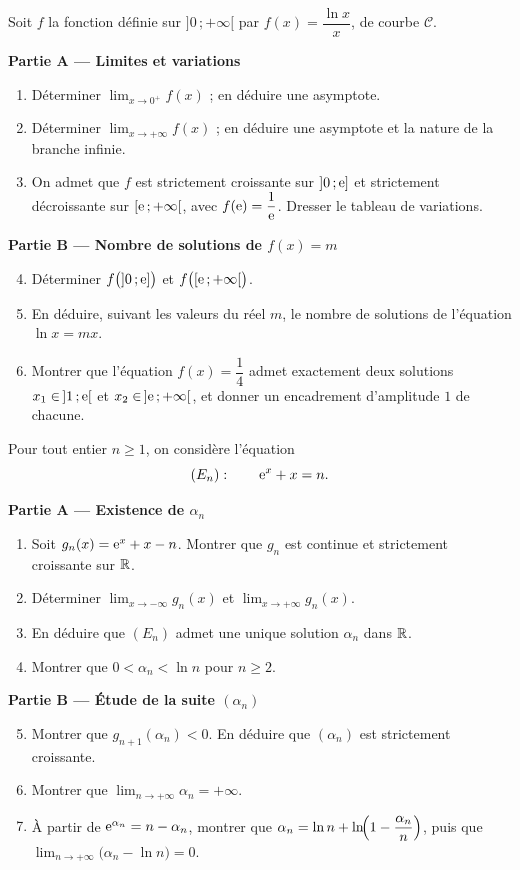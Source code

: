 Soit $f$ la fonction définie sur $]0\,;+\infty[$ par $f(x)=\dfrac{\ln x}{x}$,
de courbe $\mathcal C$.

\textbf{Partie A — Limites et variations}
\begin{enumerate}
	\item Déterminer $\displaystyle\lim_{x\to 0^+}f(x)$ ; en déduire une
	asymptote.
	\item Déterminer $\displaystyle\lim_{x\to+\infty}f(x)$ ; en déduire une
	asymptote et la nature de la branche infinie.
	\item On admet que $f$ est strictement croissante sur $]0\,;\mathrm{e}]$ et
	strictement décroissante sur $[\mathrm{e}\,;+\infty[$, avec $f(\mathrm{e})=\dfrac{1}{\mathrm{e}}$.
	Dresser le tableau de variations.
\end{enumerate}

\textbf{Partie B — Nombre de solutions de $f(x)=m$}
\begin{enumerate}
	\setcounter{enumi}{3}
	\item Déterminer $f\bigl(]0\,;\mathrm{e}]\bigr)$ et $f\bigl([\mathrm{e}\,;+\infty[\bigr)$.
	\item En déduire, suivant les valeurs du réel $m$, le nombre de solutions de
	l'équation $\ln x=mx$.
	\item Montrer que l'équation $f(x)=\dfrac{1}{4}$ admet exactement deux
	solutions $x_1\in\,]1\,;\mathrm{e}[$ et $x_2\in\,]\mathrm{e}\,;+\infty[$, et donner un
	encadrement d'amplitude $1$ de chacune.
\end{enumerate}

Pour tout entier $n\geq 1$, on considère l'équation
\[
(E_n):\qquad \mathrm{e}^{x}+x=n .
\]

\textbf{Partie A — Existence de $\alpha_n$}
\begin{enumerate}
	\item Soit $g_n(x)=\mathrm{e}^{x}+x-n$. Montrer que $g_n$ est continue et
	strictement croissante sur $\mathbb{R}$.
	\item Déterminer $\displaystyle\lim_{x\to-\infty}g_n(x)$ et
	$\displaystyle\lim_{x\to+\infty}g_n(x)$.
	\item En déduire que $(E_n)$ admet une unique solution $\alpha_n$ dans $\mathbb{R}$.
	\item Montrer que $0<\alpha_n<\ln n$ pour $n\geq 2$.
\end{enumerate}

\textbf{Partie B — Étude de la suite $(\alpha_n)$}
\begin{enumerate}
	\setcounter{enumi}{4}
	\item Montrer que $g_{n+1}(\alpha_n)<0$. En déduire que $(\alpha_n)$ est
	strictement croissante.
	\item Montrer que $\displaystyle\lim_{n\to+\infty}\alpha_n=+\infty$.
	\item À partir de $\mathrm{e}^{\alpha_n}=n-\alpha_n$, montrer que
	$\alpha_n=\ln n+\ln\!\Bigl(1-\dfrac{\alpha_n}{n}\Bigr)$, puis que
	$\displaystyle\lim_{n\to+\infty}\bigl(\alpha_n-\ln n\bigr)=0$.
\end{enumerate}

